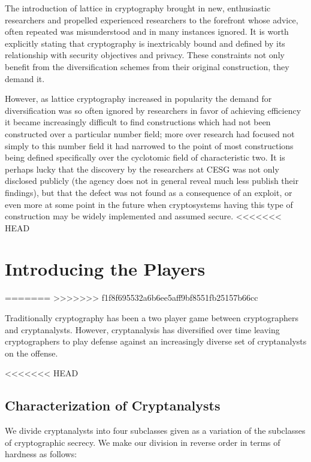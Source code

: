 The introduction of lattice in cryptography brought in new,
enthusiastic researchers and propelled experienced researchers to the
forefront whose advice, often repeated was misunderstood and in many
instances ignored.
It is worth explicitly stating that cryptography is inextricably bound and
defined by its relationship with security objectives and privacy. These
constraints not only benefit from the diversification schemes from
their original construction, they demand it.

However, as lattice cryptography increased in popularity the demand
for diversification was so often ignored by researchers in favor of
achieving efficiency it became increasingly difficult to find
constructions which had not been constructed over a particular number
field; more over research had focused not simply to this number field
it had narrowed to the point of most constructions being defined
specifically over the cyclotomic field of characteristic two.
It is perhaps lucky that the discovery by the researchers at CESG was
not only disclosed publicly (the agency does not in general reveal much
less publish their findings), but that the defect was not found as a
consequence of an exploit, or even more at some point in the future
when cryptosystems having this type of construction may be widely
implemented and assumed secure.
<<<<<<< HEAD

\section{Introducing the Players}
=======
>>>>>>> f1f8f695532a6b6ee5aff9bf8551fb25157b66cc

Traditionally cryptography has been a two player game between
cryptographers and cryptanalysts. However, cryptanalysis has
diversified over time leaving cryptographers to play defense against an
increasingly diverse set of cryptanalysts on the offense.

<<<<<<< HEAD
\subsection{Characterization of Cryptanalysts}

We divide cryptanalysts into four subclasses given as a variation of
the subclasses of cryptographic secrecy.
We make our division in reverse order in terms of hardness as
follows:

